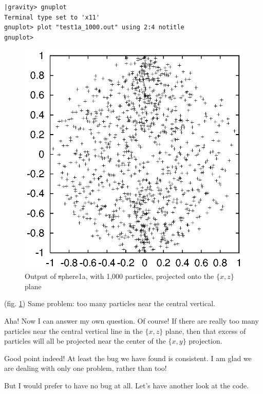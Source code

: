 \cba

\begin{small}
\begin{verbatim}
|gravity> gnuplot
Terminal type set to 'x11'
gnuplot> plot "test1a_1000.out" using 2:4 notitle
gnuplot>
\end{verbatim}
\end{small}

\begin{figure}[htb]
\centering
\includegraphics[width=4.5in]{chap9/test1axz1000.ps}
\caption[xz plot of {\st sphere1a} output]
{Output of {\st sphere1a}, with 1,000 particles, projected onto the
$\{x,z\}$ plane}
\label{fig:sphere1axz1000}
\end{figure}

\abc

\carol
(fig. \ref{fig:sphere1axz1000}) 
Same problem: too many particles near the central vertical.

\bob
Aha!  Now I can answer my own question.  Of course!  If there are
really too many particles near the central vertical line in the
$\{x,z\}$ plane, then that excess of particles will all be projected
near the center of the $\{x,y\}$ projection.

\alice
Good point indeed!  At least the bug we have found is consistent.
I am glad we are dealing with only one problem, rather than too!

\carol
But I would prefer to have no bug at all.  Let's have another look at
the code.


